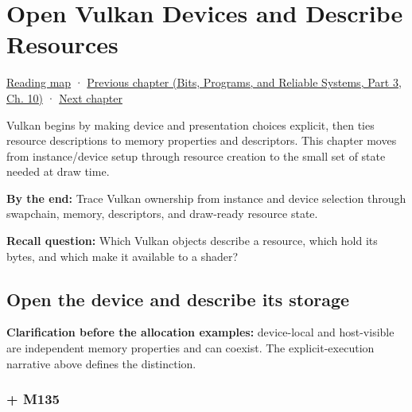\chapter{Open Vulkan Devices and Describe Resources}\label{01-foundations-i-ch013-open-vulkan-devices-and-describe-resources}\hypertarget{01-foundations-i-ch013}{}\label{stagechapter:01-foundations-i-ch013}

\hypertarget{01-foundations-i-ch013-open-vulkan-devices-and-describe-resources}{}

\hyperref[volume-reading-map]{Reading map} · \href{../01-Bits-Programs-and-Reliable-Systems-P03/main.pdf\#nameddest=01-foundations-i-ch012-commands-async-work-and-resource-lifetimes}{Previous chapter (Bits, Programs, and Reliable Systems, Part 3, Ch. 10)} · \hyperref[01-foundations-i-ch014-submit-synchronize-and-retire-gpu-work]{Next chapter}

Vulkan begins by making device and presentation choices explicit, then ties resource descriptions to memory properties and descriptors. This chapter moves from instance/device setup through resource creation to the small set of state needed at draw time.

\textbf{By the end:} Trace Vulkan ownership from instance and device selection through swapchain, memory, descriptors, and draw-ready resource state.

\textbf{Recall question:} Which Vulkan objects describe a resource, which hold its bytes, and which make it available to a shader?

\section{Open the device and describe its storage}\label{01-foundations-i-ch013-open-the-device-and-describe-its-storage}

\hypertarget{01-foundations-i-ch013-open-the-device-and-describe-its-storage}{}

\textbf{Clarification before the allocation examples:} device-local and host-visible are independent memory properties and can coexist. The explicit-execution narrative above defines the distinction.

\subsection{+ M135}\label{01-foundations-i-ch013-m135}

\hypertarget{01-foundations-i-ch013-m135}{}

